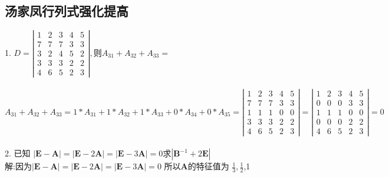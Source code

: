 \documentclass[a4paper,fleqn]{article}
\begin{document}
\subsection{汤家凤行列式强化提高}
1. $D=\left|\begin{array}{ccccc}{1} & {2} & {3} & {4} & {5} \\ {7} & {7} & {7} & {3} & {3} \\ {3} & {2} & {4} & {5} & {2} \\ {3} & {3} & {3} & {2} & {2} \\ {4} & {6} & {5} & {2} & {3}\end{array}\right|, \text {则} A_{31}+A_{32}+A_{33}=$ \\ \\
$A_{31}+A_{32}+A_{33}=1*A_{31}+1*A_{32}+1*A_{33}+0*A_{34}+0*A_{35} = \left|\begin{array}{ccccc}{1} & {2} & {3} & {4} & {5} \\ {7} & {7} & {7} & {3} & {3} \\ {1} & {1} & {1} & {0} & {0} \\ {3} & {3} & {3} & {2} & {2} \\ {4} & {6} & {5} & {2} & {3} \end{array}\right| = \left|\begin{array}{lllll}{1} & {2} & {3} & {4} & {5} \\ {0} & {0} & {0} & {3} & {3} \\ {1} & {1} & {1} & {0} & {0} \\ {0} & {0} & {0} & {2} & {2} \\ {4} & {6} & {5} & {2} & {3}\end{array}\right|=0$ \\ \\
2.
已知
$|\boldsymbol{E}-\boldsymbol{A}|=|\boldsymbol{E}-2 \boldsymbol{A}|=|\boldsymbol{E}-3 \boldsymbol{A}|=0$求$ \left|\boldsymbol{B}^{-1}+2 \boldsymbol{E}\right|$ \\ 
解:因为$|\boldsymbol{E}-\boldsymbol{A}|=|\boldsymbol{E}-2 \boldsymbol{A}|=|\boldsymbol{E}-3 \boldsymbol{A}|=0$
所以$\boldsymbol{A}$的特征值为 $\frac{1}{3},\frac{1}{2}$,1
\end{document}
